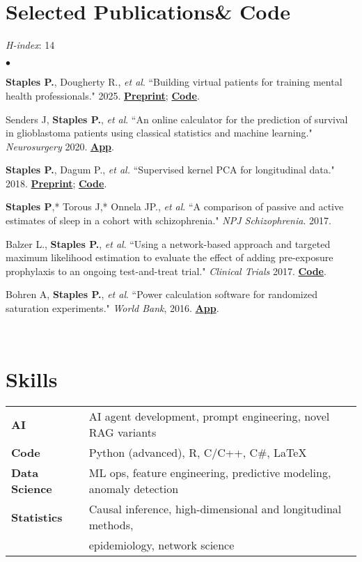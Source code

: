 \documentclass[margin,line]{res}
\newenvironment{bulletlist}{
  \begin{list}{$\bullet$}{%
      \setlength{\itemsep}{0cm}
      \setlength{\parsep}{0cm}
      \setlength{\parskip}{0cm}
      \setlength{\topsep}{0cm}
      \setlength{\partopsep}{0cm}
      \setlength{\leftmargin}{0.15in}
      \setlength{\labelwidth}{0.05in}
      \setlength{\labelsep}{0.1in}
      \setlength{\itemindent}{0in}
      \setlength{\rightmargin}{0in}}}
  {\end{list}}
\let\oldhref\href
\renewcommand{\href}[2]{\oldhref{#1}{\textbf{#2}}}
\begin{document}
\begin{resume}
\ \\[-.75cm]
\section{\sc Selected Publications\quad\quad \& Code}
{\it H-index}: 14 \\[-.1cm]

\begin{bulletlist}
\item {\bf Staples P.}, Dougherty R., {\it et al}. ``Building virtual patients for training mental health professionals." 2025. \href{https://osf.io/preprints/psyarxiv/epqtc_v2}{Preprint}; \href{https://github.com/compasspathways/ai-patient-demo/}{Code}.
\item Senders J, \textbf{Staples P.}, {\it et al}. ``An online calculator for the prediction of survival in glioblastoma patients using classical statistics and machine learning." {\it Neurosurgery} 2020. \href{https://cnoc-bwh.shinyapps.io/gbmsurvivalpredictor/}{App}.
\item \textbf{Staples P.}, Dagum P., {\it et al.} ``Supervised kernel PCA for longitudinal data." 2018. \href{https://arxiv.org/abs/1808.06638}{Preprint}; \href{https://pypi.org/project/sklPCA/}{Code}.
\item {\bf Staples P},* Torous J,* Onnela JP., {\it et al}. ``A comparison of passive and active estimates of sleep in a cohort with schizophrenia." {\it NPJ Schizophrenia}. 2017.
\item Balzer L., {\bf Staples P.}, {\it et al}. ``Using a network-based approach and targeted maximum likelihood estimation to evaluate the effect of adding pre-exposure prophylaxis to an ongoing test-and-treat trial." {\it Clinical Trials} 2017. \href{https://github.com/ctphoenix/HIV-PrEP-Simulation}{Code}.
\item Bohren A, {\bf Staples P.}, {\it et al}. ``Power calculation software for randomized saturation experiments." {\it World Bank}, 2016. \href{https://blogs.worldbank.org/en/impactevaluations/power-calculation-software-randomized-saturation-experiments}{App}.
\end{bulletlist}

\ \\[-.75cm]
\section{\sc Skills}
\begin{tabular}{ll}
{\bf AI} & AI agent development, prompt engineering, novel RAG variants \\
{\bf Code} & Python (advanced), R, C/C++, C\#, \LaTeX \\
{\bf Data Science} & ML ops, feature engineering, predictive modeling, anomaly detection\\
{\bf Statistics} & Causal inference, high-dimensional and longitudinal methods,\\
&epidemiology, network science \\
\end{tabular}

\end{resume}
\end{document}
